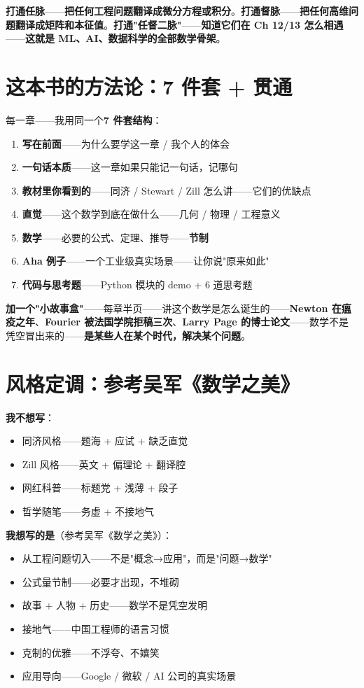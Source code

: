 \textbf{打通任脉}——\textbf{把任何工程问题翻译成微分方程或积分}。\textbf{打通督脉}——\textbf{把任何高维问题翻译成矩阵和本征值}。\textbf{打通"任督二脉"}——\textbf{知道它们在 Ch 12/13 怎么相遇}——\textbf{这就是 ML、AI、数据科学的全部数学骨架}。

\section*{这本书的方法论：7 件套 + 贯通}

每一章——我用同一个\textbf{7 件套结构}：

\begin{enumerate}
\item \textbf{写在前面}——为什么要学这一章 / 我个人的体会
\item \textbf{一句话本质}——这一章如果只能记一句话，记哪句
\item \textbf{教材里你看到的}——同济 / Stewart / Zill 怎么讲——它们的优缺点
\item \textbf{直觉}——这个数学到底在做什么——几何 / 物理 / 工程意义
\item \textbf{数学}——必要的公式、定理、推导——\textbf{节制}
\item \textbf{Aha 例子}——一个工业级真实场景——让你说"原来如此"
\item \textbf{代码与思考题}——Python 模块的 demo + 6 道思考题
\end{enumerate}

\textbf{加一个"小故事盒"}——每章半页——讲这个数学是怎么诞生的——\textbf{Newton 在瘟疫之年}、\textbf{Fourier 被法国学院拒稿三次}、\textbf{Larry Page 的博士论文}——数学不是凭空冒出来的——\textbf{是某些人在某个时代，解决某个问题}。

\section*{风格定调：参考吴军《数学之美》}

\textbf{我不想写}：

\begin{itemize}
\item 同济风格——题海 + 应试 + 缺乏直觉
\item Zill 风格——英文 + 偏理论 + 翻译腔
\item 网红科普——标题党 + 浅薄 + 段子
\item 哲学随笔——务虚 + 不接地气
\end{itemize}

\textbf{我想写的是}（参考吴军《数学之美》）：

\begin{itemize}
\item 从工程问题切入——不是"概念→应用"，而是"问题→数学"
\item 公式量节制——必要才出现，不堆砌
\item 故事 + 人物 + 历史——数学不是凭空发明
\item 接地气——中国工程师的语言习惯
\item 克制的优雅——不浮夸、不嬉笑
\item 应用导向——Google / 微软 / AI 公司的真实场景
\end{itemize}

